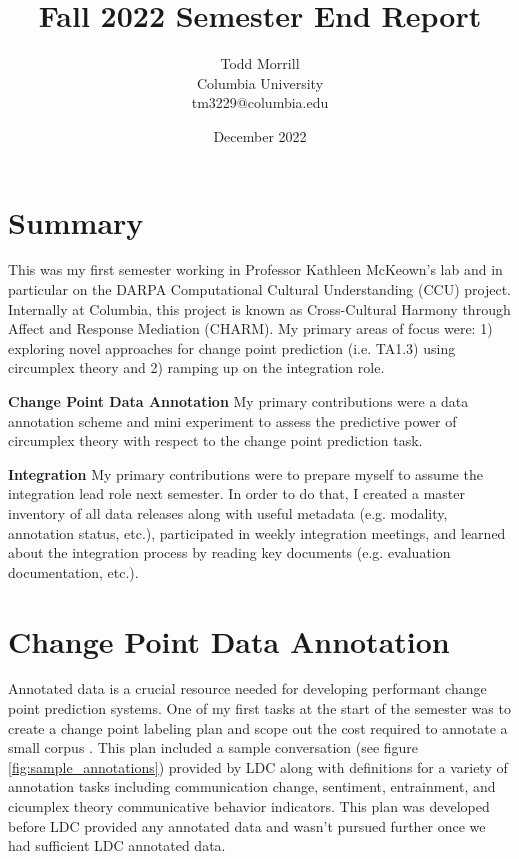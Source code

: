 \documentclass[12pt]{article}
\title{Fall 2022 Semester End Report}
\author{Todd Morrill\\
Columbia University\\
tm3229@columbia.edu}
\date{December 2022}
\begin{document}
\maketitle

\section{Summary}
This was my first semester working in Professor Kathleen McKeown's lab and in particular on the DARPA Computational Cultural Understanding (CCU) \cite{DARPA_2021} project. Internally at Columbia, this project is known as Cross-Cultural Harmony through Affect and Response Mediation (CHARM). My primary areas of focus were: 1) exploring novel approaches for change point prediction (i.e. TA1.3) using circumplex theory and 2) ramping up on the integration role.

\textbf{Change Point Data Annotation} My primary contributions were a data annotation scheme and mini experiment to assess the predictive power of circumplex theory with respect to the change point prediction task.

\textbf{Integration} My primary contributions were to prepare myself to assume the integration lead role next semester. In order to do that, I created a master inventory of all data releases along with useful metadata (e.g. modality, annotation status, etc.), participated in weekly integration meetings, and learned about the integration process by reading key documents (e.g. evaluation documentation, etc.).

\section{Change Point Data Annotation}
Annotated data is a crucial resource needed for developing performant change point prediction systems. One of my first tasks at the start of the semester was to create a change point labeling plan and scope out the cost required to annotate a small corpus \cite{Morrill_2022a}. This plan included a sample conversation (see figure \ref{fig:sample_annotations}) provided by LDC along with definitions for a variety of annotation tasks including communication change, sentiment, entrainment, and cicumplex theory communicative behavior indicators. This plan was developed before LDC provided any annotated data and wasn't pursued further once we had sufficient LDC annotated data. 
\end{document}
